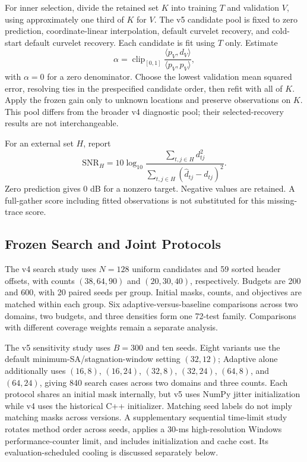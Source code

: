 \documentclass[journal]{IEEEtran}
\begin{document}
For inner selection, divide the retained set $K$ into training $T$ and validation $V$, using approximately one third of $K$ for $V$. The v5 candidate pool is fixed to zero prediction, coordinate-linear interpolation, default curvelet recovery, and cold-start default curvelet recovery. Each candidate is fit using $T$ only. Estimate
\begin{equation}
\alpha=\operatorname{clip}_{[0,1]}
\frac{\langle p_V,d_V\rangle}{\langle p_V,p_V\rangle},
\end{equation}
with $\alpha=0$ for a zero denominator. Choose the lowest validation mean squared error, resolving ties in the prespecified candidate order, then refit with all of $K$. Apply the frozen gain only to unknown locations and preserve observations on $K$. This pool differs from the broader v4 diagnostic pool; their selected-recovery results are not interchangeable.

For an external set $H$, report
\begin{equation}
\mathrm{SNR}_H=10\log_{10}
\frac{\sum_{t,j\in H}d_{tj}^{2}}
{\sum_{t,j\in H}(\widehat d_{tj}-d_{tj})^{2}}.
\label{eq:snr}
\end{equation}
Zero prediction gives 0 dB for a nonzero target. Negative values are retained. A full-gather score including fitted observations is not substituted for this missing-trace score.

\subsection{Frozen Search and Joint Protocols}
The v4 search study uses $N=128$ uniform candidates and 59 sorted header offsets, with counts $(38,64,90)$ and $(20,30,40)$, respectively. Budgets are 200 and 600, with 20 paired seeds per group. Initial masks, counts, and objectives are matched within each group. Six adaptive-versus-baseline comparisons across two domains, two budgets, and three densities form one 72-test family. Comparisons with different coverage weights remain a separate analysis.

The v5 sensitivity study uses $B=300$ and ten seeds. Eight variants use the default minimum-SA/stagnation-window setting $(32,12)$; Adaptive alone additionally uses $(16,8)$, $(16,24)$, $(32,8)$, $(32,24)$, $(64,8)$, and $(64,24)$, giving 840 search cases across two domains and three counts. Each protocol shares an initial mask internally, but v5 uses NumPy jitter initialization while v4 uses the historical C++ initializer. Matching seed labels do not imply matching masks across versions. A supplementary sequential time-limit study rotates method order across seeds, applies a 30-ms high-resolution Windows performance-counter limit, and includes initialization and cache cost. Its evaluation-scheduled cooling is discussed separately below.
\end{document}

